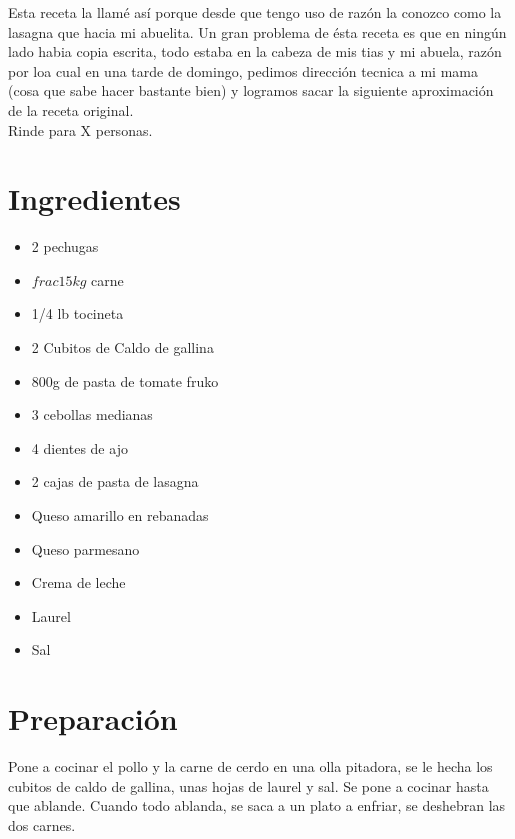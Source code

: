 Esta receta la llamé así porque desde que tengo uso de razón la conozco como la lasagna que hacia mi abuelita. Un gran problema de ésta receta es que en ningún lado habia copia escrita, todo estaba en la cabeza de mis tias y mi abuela, razón por loa cual en una tarde de domingo, pedimos dirección tecnica a mi mama (cosa que sabe hacer bastante bien) y logramos sacar la siguiente aproximación de la receta original. \\

Rinde para X personas.


\section*{Ingredientes}
\begin{itemize}
\setlength{\itemsep}{0pt}
\setlength{\parsep}{0pt} \setlength{\parskip}{0pt}
\item 2 pechugas
\item $frac{1}{5}kg$ carne
\item 1/4 lb tocineta
\item 2 Cubitos de Caldo de gallina
\item 800g de pasta de tomate fruko
\item 3 cebollas medianas
\item 4 dientes de ajo
\item 2 cajas de pasta de lasagna
\item Queso amarillo en rebanadas
\item Queso parmesano
\item Crema de leche
\item Laurel
\item Sal
\end{itemize}
\section*{Preparación}
Pone a cocinar el pollo y la carne de cerdo en una olla pitadora, se le hecha los cubitos de caldo de gallina, unas hojas de laurel y sal. Se pone a cocinar hasta que ablande. Cuando todo ablanda, se saca a un plato a enfriar, se deshebran las dos carnes.\\

